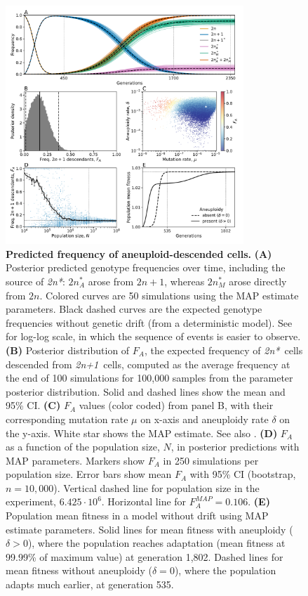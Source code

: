 \documentclass[12pt]{extarticle}
\newcommand{\anwt}{\emph{2n+1}}
\newcommand{\eumt}{\emph{2n*}}
\begin{document}
\begin{figure}[h!]
      \centering
      \includegraphics[width=0.8\textwidth]{../figures/FA.pdf}      
  \caption{
    \textbf{Predicted frequency of aneuploid-descended cells.}     
    \textbf{(A)} Posterior predicted genotype frequencies over time, including the source of \eumt: $2n^*_A$ arose from $2n+1$, whereas $2n^*_M$ arose directly from $2n$. Colored curves are 50 simulations using the MAP estimate parameters. Black dashed curves are the expected genotype frequencies without genetic drift (from a deterministic model). 
     See  for log-log scale, in which the sequence of events is easier to observe.
    \textbf{(B)} Posterior distribution of $F_A$, the expected frequency of \eumt\ cells descended from \anwt\ cells, computed as the average frequency at the end of 100 simulations for 100,000 samples from the parameter posterior distribution.
    Solid and dashed lines show the mean and 95\% CI.
	\textbf{(C)} $F_A$ values (color coded) from panel B, with their corresponding mutation rate $\mu$ on x-axis and aneuploidy rate $\delta$ on the y-axis.
	White star shows the MAP estimate. See also .
	\textbf{(D)} $F_A$ as a function of the population size, $N$, in posterior predictions with MAP parameters. Markers show $F_A$ in 250 simulations per population size. Error bars show mean $F_A$ with 95\% CI (bootstrap, $n=10,000$). Vertical dashed line for population size in the experiment, $6.425\cdot10^6$. Horizontal line for $F_A^{MAP}=0.106$. 
	\textbf{(E)} Population mean fitness in a model without drift using MAP estimate parameters. Solid lines for mean fitness with aneuploidy ($\delta>0$), where the population reaches adaptation (mean fitness at 99.99\% of maximum value) at generation 1,802. Dashed lines for mean fitness without aneuploidy ($\delta=0$), where the population adapts much earlier, at generation 535.
     }
  \label{fig:FA}
\end{figure}
\end{document}
